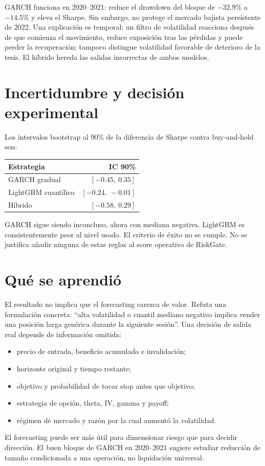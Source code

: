 \documentclass[11pt]{article}
\begin{document}
GARCH funciona en 2020--2021: reduce el drawdown del bloque de $-32.9\%$ a $-14.5\%$ y eleva el Sharpe.
Sin embargo, no protege el mercado bajista persistente de 2022. Una explicación es temporal: un filtro de
volatilidad reacciona después de que comienza el movimiento, reduce exposición tras las pérdidas y puede perder
la recuperación; tampoco distingue volatilidad favorable de deterioro de la tesis. El híbrido hereda las salidas
incorrectas de ambos modelos.

\section{Incertidumbre y decisión experimental}
Los intervalos bootstrap al 90\% de la diferencia de Sharpe contra buy-and-hold son:
\begin{center}
\begin{tabular}{lr}
\toprule
Estrategia & IC 90\%\\
\midrule
GARCH gradual & $[-0.45,\ 0.35]$\\
LightGBM cuantílico & $[-0.24,\ -0.01]$\\
Híbrido & $[-0.58,\ 0.29]$\\
\bottomrule
\end{tabular}
\end{center}
GARCH sigue siendo inconcluso, ahora con mediana negativa. LightGBM es consistentemente peor al nivel usado.
El criterio de éxito no se cumple. No se justifica añadir ninguna de estas reglas al score operativo de RiskGate.

\section{Qué se aprendió}
El resultado no implica que el forecasting carezca de valor. Refuta una formulación concreta: ``alta volatilidad
o cuantil mediano negativo implica vender una posición larga genérica durante la siguiente sesión''. Una decisión
de salida real depende de información omitida:
\begin{itemize}
  \item precio de entrada, beneficio acumulado e invalidación;
  \item horizonte original y tiempo restante;
  \item objetivo y probabilidad de tocar stop antes que objetivo;
  \item estrategia de opción, theta, IV, gamma y payoff;
  \item régimen de mercado y razón por la cual aumentó la volatilidad.
\end{itemize}
El forecasting puede ser más útil para dimensionar riesgo que para decidir dirección. El buen bloque de GARCH
en 2020--2021 sugiere estudiar reducción de tamaño condicionada a una operación, no liquidación universal.
\end{document}
